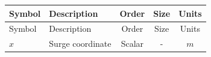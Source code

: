 \makeatletter
    \setlength{\absparsep}{18pt}
\makeatother

\begin{center}
    \textbf{\variablestitle}
\end{center}
\vspace{.5cm}

\begin{longtable}{llccc}

\hline
Symbol & Description & Order & Size & Units\\
\hline
\endfirsthead

\hline
Symbol & Description & Order & Size & Units\\
\hline
\endhead

\hline
\endfoot

\hline
\endlastfoot
    
    $x$ & Surge coordinate & Scalar & - & $m$ \\
\end{longtable}
\setcounter{table}{0}